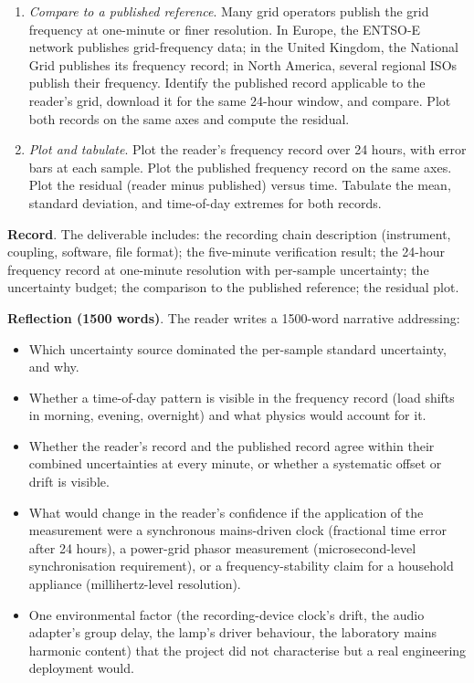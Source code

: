 \begin{project}
\begin{enumerate}[leftmargin=*]
  \item \emph{Compare to a published reference}. Many grid
    operators publish the grid frequency at one-minute or finer
    resolution. In Europe, the ENTSO-E network publishes
    grid-frequency data; in the United Kingdom, the National Grid
    publishes its frequency record; in North America, several
    regional ISOs publish their frequency. Identify the published
    record applicable to the reader's grid, download it for the
    same 24-hour window, and compare. Plot both records on the
    same axes and compute the residual.

  \item \emph{Plot and tabulate}. Plot the reader's frequency
    record over 24 hours, with error bars at each sample. Plot
    the published frequency record on the same axes. Plot the
    residual (reader minus published) versus time. Tabulate the
    mean, standard deviation, and time-of-day extremes for both
    records.
\end{enumerate}

\textbf{Record}. The deliverable includes: the recording chain
description (instrument, coupling, software, file format); the
five-minute verification result; the 24-hour frequency record at
one-minute resolution with per-sample uncertainty; the uncertainty
budget; the comparison to the published reference; the residual
plot.

\textbf{Reflection (1500 words)}. The reader writes a 1500-word
narrative addressing:

\begin{itemize}[leftmargin=*]
  \item Which uncertainty source dominated the per-sample standard
    uncertainty, and why.
  \item Whether a time-of-day pattern is visible in the frequency
    record (load shifts in morning, evening, overnight) and what
    physics would account for it.
  \item Whether the reader's record and the published record agree
    within their combined uncertainties at every minute, or whether
    a systematic offset or drift is visible.
  \item What would change in the reader's confidence if the
    application of the measurement were a synchronous mains-driven
    clock (fractional time error after 24 hours), a power-grid
    phasor measurement (microsecond-level synchronisation
    requirement), or a frequency-stability claim for a household
    appliance (millihertz-level resolution).
  \item One environmental factor (the recording-device clock's
    drift, the audio adapter's group delay, the lamp's driver
    behaviour, the laboratory mains harmonic content) that the
    project did not characterise but a real engineering
    deployment would.
\end{itemize}


\end{project}
